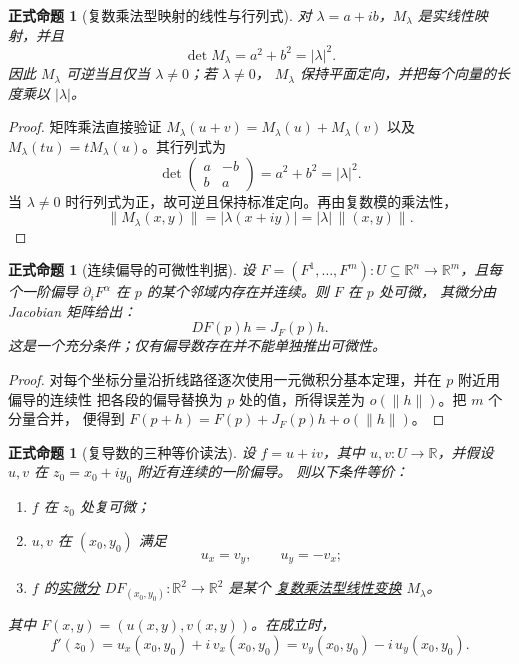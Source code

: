 \documentclass[UTF8,fontset=none,a4paper,11pt]{ctexart}
\theoremstyle{foundation-definition}
\theoremstyle{foundation-theorem}
\theoremstyle{foundation-proposition}
\newtheorem{proposition}[definition]{正式命题}
\theoremstyle{foundation-example}
\theoremstyle{foundation-remark}
\theoremstyle{foundation-theorem}
\newcommand{\term}[2]{\hyperref[#1]{#2}}
\begin{document}
\begin{proposition}[复数乘法型映射的线性与行列式]\label{prop:complex-multiplication-jacobian}
对 \(\lambda=a+ib\)，\(M_\lambda\) 是实线性映射，并且
\[
\det M_\lambda=a^2+b^2=|\lambda|^2.
\]
因此 \(M_\lambda\) 可逆当且仅当 \(\lambda\ne0\)；若 \(\lambda\ne0\)，
\(M_\lambda\) 保持平面定向，并把每个向量的长度乘以 \(|\lambda|\)。
\end{proposition}

\begin{proof}
矩阵乘法直接验证 \(M_\lambda(u+v)=M_\lambda(u)+M_\lambda(v)\) 以及
\(M_\lambda(tu)=tM_\lambda(u)\)。其行列式为
\[
\det\begin{pmatrix}a&-b\\ b&a\end{pmatrix}=a^2+b^2=|\lambda|^2.
\]
当 \(\lambda\ne0\) 时行列式为正，故可逆且保持标准定向。再由复数模的乘法性，
\[
\|M_\lambda(x,y)\|=|\lambda(x+iy)|=|\lambda|\,\|(x,y)\|.
\]
\end{proof}

\begin{proposition}[连续偏导的可微性判据]\label{prop:continuous-partials-differentiable}
设 \(F=(F^1,\ldots,F^m):U\subseteq\mathbb R^n\to\mathbb R^m\)，且每个一阶偏导
\(\partial_iF^\alpha\) 在 \(p\) 的某个邻域内存在并连续。则 \(F\) 在 \(p\) 处可微，
其微分由 Jacobian 矩阵给出：
\[
DF(p)h=J_F(p)h.
\]
这是一个充分条件；仅有偏导数存在并不能单独推出可微性。
\end{proposition}

\begin{proof}
对每个坐标分量沿折线路径逐次使用一元微积分基本定理，并在 \(p\) 附近用偏导的连续性
把各段的偏导替换为 \(p\) 处的值，所得误差为 \(o(\lVert h\rVert)\)。把 \(m\) 个分量合并，
便得到 \(F(p+h)=F(p)+J_F(p)h+o(\lVert h\rVert)\)。
\end{proof}

\begin{proposition}[复导数的三种等价读法]\label{prop:complex-differential-cr}
设 \(f=u+iv\)，其中 \(u,v:U\to\mathbb R\)，并假设 \(u,v\) 在 \(z_0=x_0+iy_0\) 附近有连续的一阶偏导。
则以下条件等价：
\begin{enumerate}[label=(\alph*)]
  \item \(f\) 在 \(z_0\) 处复可微；
  \item \(u,v\) 在 \((x_0,y_0)\) 满足
  \[
  u_x=v_y,\qquad u_y=-v_x;
  \]
  \item \(f\) 的\term{def:total-differential}{实微分}
  \(DF_{(x_0,y_0)}:\mathbb R^2\to\mathbb R^2\) 是某个
  \term{def:complex-multiplication-linear-map}{复数乘法型线性变换}
  \(M_\lambda\)。
\end{enumerate}
其中 \(F(x,y)=(u(x,y),v(x,y))\)。在成立时，
\[
f'(z_0)=u_x(x_0,y_0)+i\,v_x(x_0,y_0)
       =v_y(x_0,y_0)-i\,u_y(x_0,y_0).
\]
\end{proposition}
\end{document}
